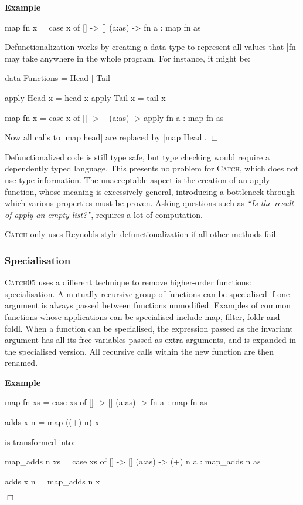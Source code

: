 \documentclass[preprint]{sigplanconf}
\newcommand{\C}[1]{\textsf{#1}}
\newcommand{\catch}{\textsc{Catch}}
\newcommand{\oldtool}{\catch05}
\newcounter{exmp}
\newcommand{\yesexample}{\addtocounter{exmp}{1}\addvspace{2mm}\noindent\textbf{Example \arabic{exmp}}}
\newcommand{\noexample}{\hfill\ensuremath{\Box}\par\addvspace{2mm}}
\newenvironment{example}{\yesexample}{\noexample}
\newcommand{\ignore}{}
\begin{document}
\begin{example}
\begin{code}
map fn x = case  x of
                 []      -> []
                 (a:as)  -> fn a : map fn as
\end{code}

\noindent Defunctionalization works by creating a data type to represent all values that |fn| may take anywhere in the whole program. For instance, it might be:

\ignore\begin{code}
data Functions = Head | Tail

apply Head  x = head  x
apply Tail  x = tail  x

map fn x = case  x of
                 []      -> []
                 (a:as)  -> apply fn a : map fn as
\end{code}

\noindent Now all calls to |map head| are replaced by \ignore|map Head|.
\end{example}

Defunctionalized code is still type safe, but type checking would require a dependently typed language. This presents no problem for \catch{}, which does not use type information. The unacceptable aspect is the creation of an \C{apply} function, whose meaning is excessively general, introducing a bottleneck through which various properties must be proven. Asking questions such as \textit{``Is the result of \C{apply} an empty-list?''}, requires a lot of computation.

\catch{} only uses Reynolds style defunctionalization if all other methods fail.


\subsubsection{Specialisation}

\oldtool{} uses a different technique to remove higher-order functions: specialisation. A mutually recursive group of functions can be specialised if one argument is always passed between functions unmodified. Examples of common functions whose applications can be specialised include \C{map}, \C{filter}, \C{foldr} and \C{foldl}. When a function can be specialised, the expression passed as the invariant argument has all its free variables passed as extra arguments, and is expanded in the specialised version. All recursive calls within the new function are then renamed.

\begin{example}
\begin{code}
map fn xs = case  xs of
                  []      -> []
                  (a:as)  -> fn a : map fn as

adds x n = map ((+) n) x
\end{code}

\noindent is transformed into:

\begin{code}
map_adds n xs = case  xs of
                      []      -> []
                      (a:as)  -> (+) n a : map_adds n as

adds x n = map_adds n x
\end{code}
\end{example}
\end{document}
